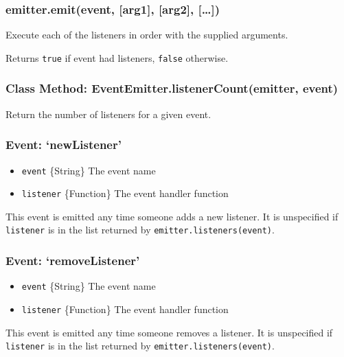 \subsubsection{emitter.emit(event, {[}arg1{]}, {[}arg2{]},
{[}\ldots{}{]})}

Execute each of the listeners in order with the supplied arguments.

Returns \texttt{true} if event had listeners, \texttt{false} otherwise.

\subsubsection{Class Method: EventEmitter.listenerCount(emitter, event)}

Return the number of listeners for a given event.

\subsubsection{Event: `newListener'}

\begin{itemize}
\item
  \texttt{event} \{String\} The event name
\item
  \texttt{listener} \{Function\} The event handler function
\end{itemize}

This event is emitted any time someone adds a new listener. It is
unspecified if \texttt{listener} is in the list returned by
\texttt{emitter.listeners(event)}.

\subsubsection{Event: `removeListener'}

\begin{itemize}
\item
  \texttt{event} \{String\} The event name
\item
  \texttt{listener} \{Function\} The event handler function
\end{itemize}

This event is emitted any time someone removes a listener. It is
unspecified if \texttt{listener} is in the list returned by
\texttt{emitter.listeners(event)}.
